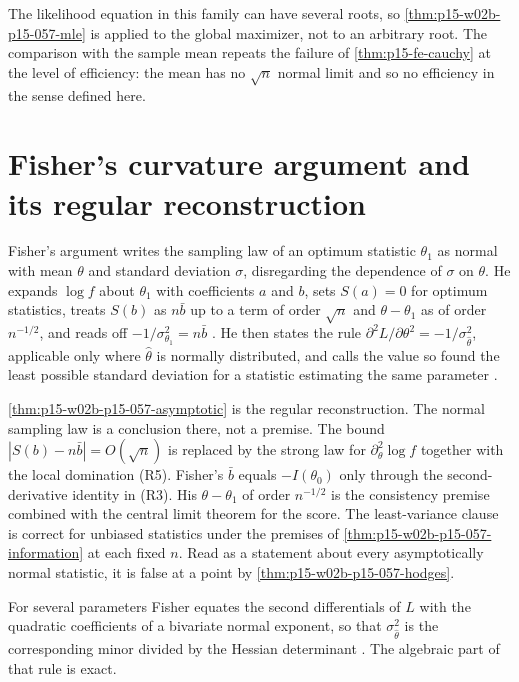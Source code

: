 The likelihood equation in this family can have several roots, so
\cref{thm:p15-w02b-p15-057-mle} is applied to the global maximizer, not to
an arbitrary root. The comparison with the sample mean repeats the failure
of \cref{thm:p15-fe-cauchy} at the level of efficiency: the mean has no
\(\sqrt n\) normal limit and so no efficiency in the sense defined here.

\section{Fisher's curvature argument and its regular reconstruction}
\label{sec:p15-w02b-p15-057-fisher-curvature}

Fisher's argument writes the sampling law of an optimum statistic
\(\theta_1\) as normal with mean \(\theta\) and standard deviation
\(\sigma\), disregarding the dependence of \(\sigma\) on \(\theta\). He
expands \(\log f\) about \(\theta_1\) with coefficients \(a\) and \(b\),
sets \(S(a)=0\) for optimum statistics, treats \(S(b)\) as \(n\bar b\) up
to a term of order \(\sqrt n\) and \(\theta-\theta_1\) as of order
\(n^{-1/2}\), and reads off \(-1/\sigma_{\theta_1}^2=n\bar b\)
\cite[pp.~328--329]{Fisher1922Foundations}. He then states the rule
\(\partial^2L/\partial\theta^2=-1/\sigma_{\hat\theta}^2\), applicable
only where \(\hat\theta\) is normally distributed, and calls the value so
found the least possible standard deviation for a statistic estimating the
same parameter \cite[pp.~331--332]{Fisher1922Foundations}.

\cref{thm:p15-w02b-p15-057-asymptotic} is the regular reconstruction. The
normal sampling law is a conclusion there, not a premise. The bound
\(|S(b)-n\bar b|=O(\sqrt n)\) is replaced by the strong law for
\(\partial_\theta^2\log f\) together with the local domination (R5).
Fisher's \(\bar b\) equals \(-I(\theta_0)\) only through the
second-derivative identity in (R3). His \(\theta-\theta_1\) of order
\(n^{-1/2}\) is the consistency premise combined with the central limit
theorem for the score. The least-variance clause is correct for unbiased
statistics under the premises of \cref{thm:p15-w02b-p15-057-information}
at each fixed \(n\). Read as a statement about every asymptotically normal
statistic, it is false at a point by \cref{thm:p15-w02b-p15-057-hodges}.

For several parameters Fisher equates the second differentials of \(L\)
with the quadratic coefficients of a bivariate normal exponent, so that
\(\sigma_{\hat\theta}^2\) is the corresponding minor divided by the Hessian
determinant \cite[p.~332]{Fisher1922Foundations}. The algebraic part of
that rule is exact.

